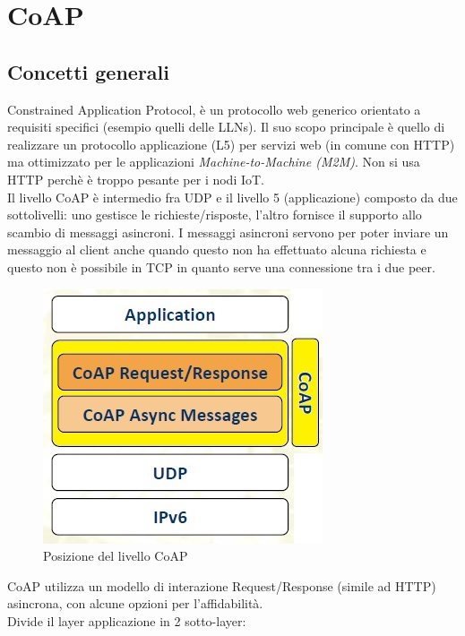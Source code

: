 \documentclass{article}
\begin{document}
\newpage
\section{CoAP}
\subsection{Concetti generali}
Constrained Application Protocol, è un protocollo web generico orientato a requisiti specifici (esempio quelli delle LLNs). Il suo scopo principale è quello di realizzare un protocollo applicazione (L5) per servizi web (in comune con HTTP) ma ottimizzato per le applicazioni \textit{Machine-to-Machine (M2M)}. Non si usa HTTP perchè è troppo pesante per i nodi IoT.\\
Il livello CoAP è intermedio fra UDP e il livello 5 (applicazione) composto da due sottolivelli: uno gestisce le richieste/risposte, l'altro fornisce il supporto allo scambio di messaggi asincroni. I messaggi asincroni servono per poter inviare un messaggio al client anche quando questo non ha effettuato alcuna richiesta e questo non è possibile in TCP in quanto serve una connessione tra i due peer.\\
\begin{figure}[H]
\centering
\includegraphics[scale=0.4]{figures/coaplayer.jpg}
\caption{Posizione del livello CoAP}
\end{figure}
\noindent CoAP utilizza un modello di interazione Request/Response (simile ad HTTP) asincrona, con alcune opzioni per l'affidabilità. \\ Divide il layer applicazione in 2 sotto-layer:
\end{document}
